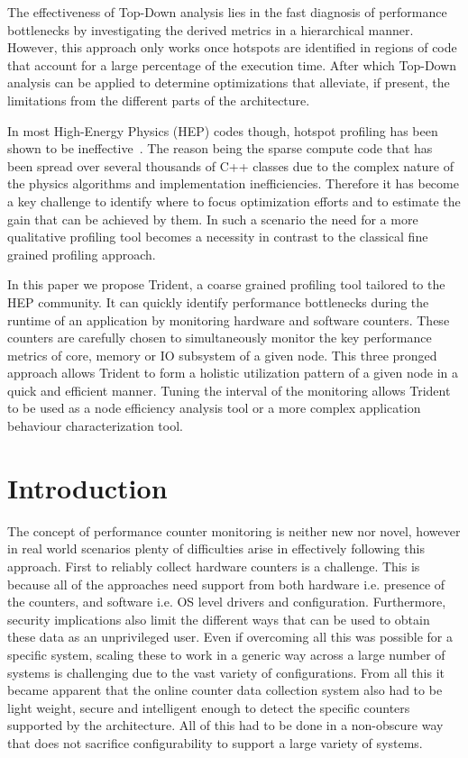 \documentclass{webofc}
\begin{document}
The effectiveness of Top-Down analysis lies in the fast diagnosis of performance bottlenecks by investigating the derived metrics in a hierarchical manner. However, this approach only works once hotspots are identified in regions of code that account for a large percentage of the execution time. After which Top-Down analysis can be applied to determine optimizations that alleviate, if present, the limitations from the different parts of the architecture. 

In most High-Energy Physics (HEP) codes though, hotspot profiling has been shown to be ineffective~\cite{atlasg4perf}. The reason being the sparse compute code that has been spread over several thousands of C++ classes due to the complex nature of the physics algorithms and implementation inefficiencies. Therefore it has become a key challenge to identify where to focus optimization efforts and to estimate the gain that can be achieved by them. In such a scenario the need for a more qualitative profiling tool becomes a necessity in contrast to the classical fine grained profiling approach.

In this paper we propose Trident, a coarse grained profiling tool tailored to the HEP community. It can quickly identify performance bottlenecks during the runtime of an application by monitoring hardware and software counters. These counters are carefully chosen to simultaneously monitor the key performance metrics of core, memory or IO subsystem of a given node. This three pronged approach allows Trident to form a holistic utilization pattern of a given node in a quick and efficient manner. Tuning the interval of the monitoring allows Trident to be used as a node efficiency analysis tool or a more complex application behaviour characterization tool.

\section{Introduction}
\label{sec:intro}

The concept of performance counter monitoring is neither new nor novel, however in real world scenarios plenty of difficulties arise in effectively following this approach. First to reliably collect hardware counters is a challenge. This is because all of the approaches need support from both hardware i.e. presence of the counters, and software i.e. OS level drivers and configuration. Furthermore, security implications also limit the different ways that can be used to obtain these data as an unprivileged user. Even if overcoming all this was possible for a specific system, scaling these to work in a generic way across a large number of systems is challenging due to the vast variety of configurations. From all this it became apparent that the online counter data collection system also had to be light weight, secure and intelligent enough to detect the specific counters supported by the architecture. All of this had to be done in a non-obscure way that does not sacrifice configurability to support a large variety of systems.
\end{document}
